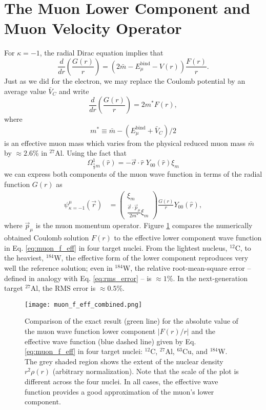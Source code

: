 \documentclass{book}[12pt]
\begin{document}
\section{The Muon Lower Component and Muon Velocity Operator}
\label{sec:muon_lower}
For $\kappa=-1$, the radial Dirac equation implies that
\begin{equation}
\frac{d}{dr}\left(\frac{G(r)}{r}\right)=\left(2\bar{m}-E^\mathrm{bind}_{\mu}-V(r)\right)\frac{F(r)}{r}.
\end{equation}
Just as we did for the electron, we may replace the Coulomb potential by an average value $\bar{V}_C$ and write
\begin{equation}
\frac{d}{dr}\left(\frac{G(r)}{r}\right)=2m^*F(r),
\end{equation}
where
\begin{equation}
m^*\equiv \bar{m}-\left(E^\mathrm{bind}_{\mu}+\bar{V}_C\right)/2
\end{equation}
is an effective muon mass which varies from the physical reduced muon mass $\bar{m}$ by $\approx 2.6$\% in $^{27}$Al. Using the fact that 
\begin{equation}
\Omega^1_{\frac{1}{2}m}(\hat{r})=-\vec{\sigma}\cdot\hat{r}\;Y_{00}(\hat{r})\xi_m
\end{equation}
we can express both components of the muon wave function in terms of the radial function $G(r)$ as
\begin{equation}
\begin{split}
\psi^{\mu}_{\kappa=-1}(\vec{r})&=\left(\begin{array}{c}
\xi_m\\
\frac{\vec{\sigma}\cdot\vec{p}_{\mu}}{2m^*}\xi_m
\end{array}\right)\frac{G(r)}{r}Y_{00}(\hat{r}),
\end{split}
\label{eq:muon_f_eff}
\end{equation}
where $\vec{p}_{\mu}$ is the muon momentum operator. Figure \ref{fig:muon_f_eff} compares the numerically obtained Coulomb solution $F(r)$ to the effective lower component wave function in Eq. \ref{eq:muon_f_eff} in four target nuclei. From the lightest nucleus, $^{12}$C, to the heaviest, $^{184}$W, the effective form of the lower component reproduces very well the reference solution; even in $^{184}$W, the relative root-mean-square error -- defined in analogy with Eq. \ref{eq:rms_error} -- is $\approx 1$\%. In the next-generation target $^{27}$Al, the RMS error is $\approx 0.5$\%. 

\begin{figure}
\texttt{[image: muon\_f\_eff\_combined.png]}
\caption{Comparison of the exact result (green line) for the absolute value of the muon wave function lower component $|F(r)/r|$ and the effective wave function (blue dashed line) given by Eq. \ref{eq:muon_f_eff} in four target nuclei: $^{12}$C, $^{27}$Al, $^{63}$Cu, and $^{184}$W. The grey shaded region shows the extent of the nuclear density $r^2\rho(r)$ (arbitrary normalization). Note that the scale of the plot is different across the four nuclei. In all cases, the effective wave function provides a good approximation of the muon's lower component.} 
\label{fig:muon_f_eff}
\end{figure}
\end{document}
